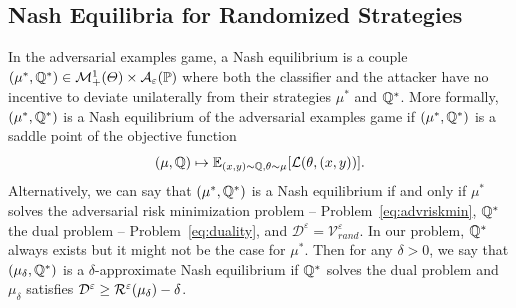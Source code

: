 



\subsection{Nash Equilibria for Randomized Strategies}

In the adversarial examples game, a Nash equilibrium is a couple $(\mu^*,\mathbb{Q}^*)\in\mathcal{M}^1_+(\Theta)\times\mathcal{A}_\varepsilon(\mathbb{P})$ where both the classifier and the attacker have no incentive to deviate unilaterally from their strategies $\mu^*$ and $\mathbb{Q}^*$. More formally, $(\mu^*,\mathbb{Q}^*)$ is a Nash equilibrium of the adversarial examples game if $(\mu^*,\mathbb{Q}^*)$ is a saddle point of the objective function $$(\mu,\QQ)\mapsto \mathbb{E}_{(x,y)\sim\QQ,\theta\sim\mu}\left[\loss(\theta,(x,y))\right].$$ Alternatively, we can say that $(\mu^*,\mathbb{Q}^*)$ is a Nash equilibrium if and only if $\mu^*$ solves the adversarial risk minimization problem -- Problem~\eqref{eq:advriskmin}, $\mathbb{Q}^*$ the dual problem -- Problem~\eqref{eq:duality}, and $\mathcal{D}^\varepsilon=\mathcal{V}_{rand}^\varepsilon$. In our problem, $\mathbb{Q}^*$ always exists but it might not be the case for $\mu^*$. Then for any $\delta>0$, we say that  $(\mu_\delta,\mathbb{Q}^*)$ is a $\delta$-approximate Nash equilibrium if $\mathbb{Q}^*$ solves the dual problem and $\mu_\delta$ satisfies $\mathcal{D}^\varepsilon\geq\mathcal{R}^\varepsilon(\mu_\delta)-\delta$. 

